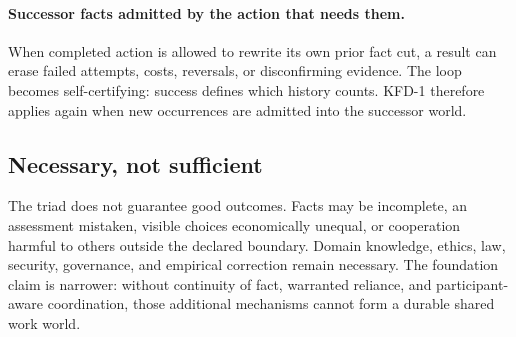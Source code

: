 \paragraph{Successor facts admitted by the action that needs them.}
When completed action is allowed to rewrite its own prior fact cut, a result
can erase failed attempts, costs, reversals, or disconfirming evidence. The
loop becomes self-certifying: success defines which history counts. KFD-1
therefore applies again when new occurrences are admitted into the successor
world.

\subsection{Necessary, not sufficient}

The triad does not guarantee good outcomes. Facts may be incomplete, an
assessment mistaken, visible choices economically unequal, or cooperation
harmful to others outside the declared boundary. Domain knowledge, ethics,
law, security, governance, and empirical correction remain necessary. The
foundation claim is narrower: without continuity of fact, warranted reliance,
and participant-aware coordination, those additional mechanisms cannot form a
durable shared work world.

